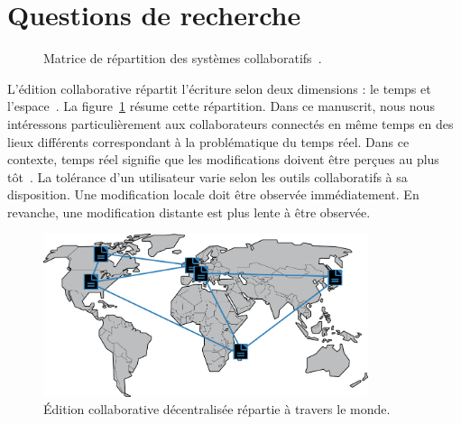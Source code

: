 
\section{Questions de recherche}


\begin{figure}
  \begin{center}
    
    \caption[Matrice de répartition des systèmes collaboratifs] {
      \label{editor:fig:groupware} Matrice de répartition des systèmes
      collaboratifs~\cite{johansen1988groupware}.}
  \end{center}
\end{figure}

L'édition collaborative répartit l'écriture selon deux dimensions : le temps et
l'espace~\cite{desanctis1987foundation, grudin1994computersupported,
  johansen1988groupware}.  La figure~\ref{editor:fig:groupware} résume cette
répartition. Dans ce manuscrit, nous nous intéressons particulièrement aux
collaborateurs connectés en même temps en des lieux différents correspondant à
la problématique du temps réel. Dans ce contexte, \og temps réel \fg signifie
que les modifications doivent être perçues au plus
tôt~\cite{ellis1989concurrency}. La tolérance d'un utilisateur varie selon les
outils collaboratifs à sa disposition. Une modification locale doit être
observée immédiatement. En revanche, une modification distante est plus lente à
être observée.

\begin{figure}
  \begin{center}
    \includegraphics[width=0.85\textwidth]{img/world.png}
    \caption[Édition collaborative décentralisée]{\label{intro:img:world}Édition
      collaborative décentralisée répartie à travers le monde.}
  \end{center}
\end{figure}

